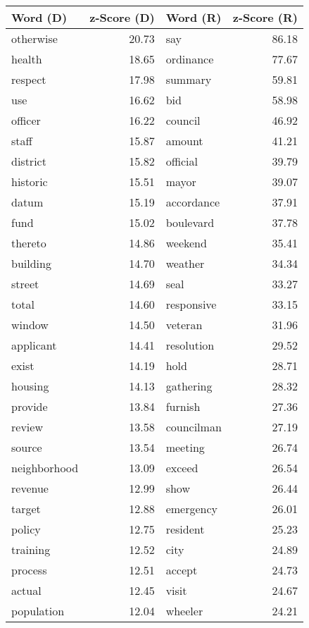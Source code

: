 \begin{table}[ht]
\centering
\begingroup\fontsize{9pt}{10pt}\selectfont
\begin{tabular}{lrlr}
  \hline
Word (D) & z-Score (D) & Word (R) & z-Score (R) \\ 
  \hline
otherwise & 20.73 & say & 86.18 \\ 
  health & 18.65 & ordinance & 77.67 \\ 
  respect & 17.98 & summary & 59.81 \\ 
  use & 16.62 & bid & 58.98 \\ 
  officer & 16.22 & council & 46.92 \\ 
  staff & 15.87 & amount & 41.21 \\ 
  district & 15.82 & official & 39.79 \\ 
  historic & 15.51 & mayor & 39.07 \\ 
  datum & 15.19 & accordance & 37.91 \\ 
  fund & 15.02 & boulevard & 37.78 \\ 
  thereto & 14.86 & weekend & 35.41 \\ 
  building & 14.70 & weather & 34.34 \\ 
  street & 14.69 & seal & 33.27 \\ 
  total & 14.60 & responsive & 33.15 \\ 
  window & 14.50 & veteran & 31.96 \\ 
  applicant & 14.41 & resolution & 29.52 \\ 
  exist & 14.19 & hold & 28.71 \\ 
  housing & 14.13 & gathering & 28.32 \\ 
  provide & 13.84 & furnish & 27.36 \\ 
  review & 13.58 & councilman & 27.19 \\ 
  source & 13.54 & meeting & 26.74 \\ 
  neighborhood & 13.09 & exceed & 26.54 \\ 
  revenue & 12.99 & show & 26.44 \\ 
  target & 12.88 & emergency & 26.01 \\ 
  policy & 12.75 & resident & 25.23 \\ 
  training & 12.52 & city & 24.89 \\ 
  process & 12.51 & accept & 24.73 \\ 
  actual & 12.45 & visit & 24.67 \\ 
  population & 12.04 & wheeler & 24.21 \\ 

\end{tabular}
\end{table}

